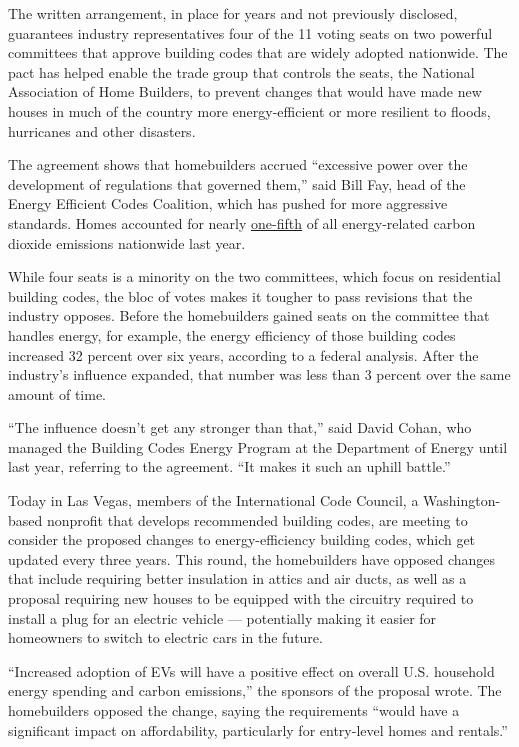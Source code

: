 The written arrangement, in place for years and not previously
disclosed, guarantees industry representatives four of the 11 voting
seats on two powerful committees that approve building codes that are
widely adopted nationwide. The pact has helped enable the trade group
that controls the seats, the National Association of Home Builders, to
prevent changes that would have made new houses in much of the country
more energy-efficient or more resilient to floods, hurricanes and other
disasters.

The agreement shows that homebuilders accrued ``excessive power over the
development of regulations that governed them,'' said Bill Fay, head of
the Energy Efficient Codes Coalition, which has pushed for more
aggressive standards. Homes accounted for nearly
\href{https://www.eia.gov/tools/faqs/faq.php?id=75\&t=11}{one-fifth} of
all energy-related carbon dioxide emissions nationwide last year.

While four seats is a minority on the two committees, which focus on
residential building codes, the bloc of votes makes it tougher to pass
revisions that the industry opposes. Before the homebuilders gained
seats on the committee that handles energy, for example, the energy
efficiency of those building codes increased 32 percent over six years,
according to a federal analysis. After the industry's influence
expanded, that number was less than 3 percent over the same amount of
time.

``The influence doesn't get any stronger than that,'' said David Cohan,
who managed the Building Codes Energy Program at the Department of
Energy until last year, referring to the agreement. ``It makes it such
an uphill battle.''

Today in Las Vegas, members of the International Code Council, a
Washington-based nonprofit that develops recommended building codes, are
meeting to consider the proposed changes to energy-efficiency building
codes, which get updated every three years. This round, the homebuilders
have opposed changes that include requiring better insulation in attics
and air ducts, as well as a proposal requiring new houses to be equipped
with the circuitry required to install a plug for an electric vehicle
--- potentially making it easier for homeowners to switch to electric
cars in the future.

``Increased adoption of EVs will have a positive effect on overall U.S.
household energy spending and carbon emissions,'' the sponsors of the
proposal wrote. The homebuilders opposed the change, saying the
requirements ``would have a significant impact on affordability,
particularly for entry-level homes and rentals.''

